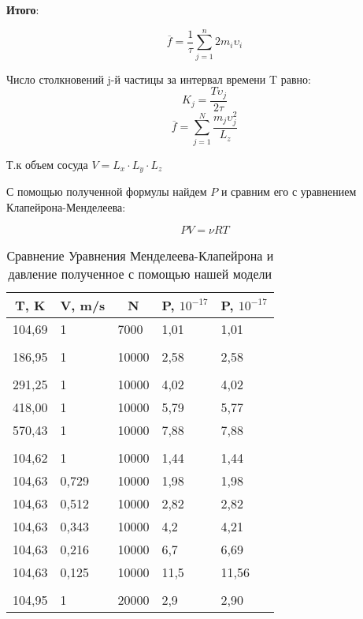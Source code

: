 \documentclass[twoside,twocolumn]{article}
\theoremstyle{plain}
\theoremstyle{definition}
\begin{document}
\textbf{Итого}:

\begin{equation}
\overline{f} = \dfrac{1}{\tau} \sum_{j=1}^n 2 m_i \upsilon_i
\end{equation}

Число столкновений j-й частицы за интервал времени T равно:
\[K_j = \dfrac{T \upsilon_j }{2\tau} \]
\[\overline{f} = \sum_{j = 1}^N \dfrac{m_j \upsilon_j^2}{L_z}\]

Т.к объем сосуда $V = L_x \cdot L_y \cdot L_z$

\begin{center}
\end{center}

\indent С помощью полученной формулы найдем $P$ и сравним его с уравнением Клапейрона-Менделеева:

\[PV = \nu R T \]

\begin{table}[h!]
\centering
\label{Table 1}
\begin{tabular}{|l|l|l|l|l|}
\hline
\multicolumn{1}{|c|}{T, K} & \multicolumn{1}{c|}{V, m/s} & \multicolumn{1}{c|}{N} & \multicolumn{1}{c|}{P, $10^{-17}$} & \multicolumn{1}{c|}{P, $10^{-17}$} \\ \hline
104,69 & 1 & 7000 & 1,01 & 1,01                                    \\
& & & &                                         \\
186,95 & 1 & 10000 & 2,58 & 2,58                                    \\
& & & &                                         \\
291,25 & 1 & 10000 & 4,02 & 4,02                                    \\
418,00 & 1 & 10000 & 5,79 & 5,77                                    \\
570,43 & 1 & 10000 & 7,88 & 7,88                                    \\
& & & &                                         \\
104,62 & 1 & 10000 & 1,44 & 1,44                                    \\
104,63 & 0,729 & 10000 & 1,98 & 1,98                                    \\
104,63 & 0,512 & 10000 & 2,82 & 2,82                                    \\
104,63 & 0,343 & 10000 & 4,2 & 4,21                                    \\
104,63 & 0,216 & 10000 & 6,7 & 6,69                                    \\
104,63 & 0,125 & 10000 & 11,5 & 11,56                                   \\
& & & &                                         \\
104,95 & 1 & 20000 & 2,9 & 2,90                                    \\ \hline
\end{tabular}
\caption{Сравнение Уравнения Менделеева-Клапейрона и давление полученное с помощью нашей модели}
\end{table}
\end{document}
